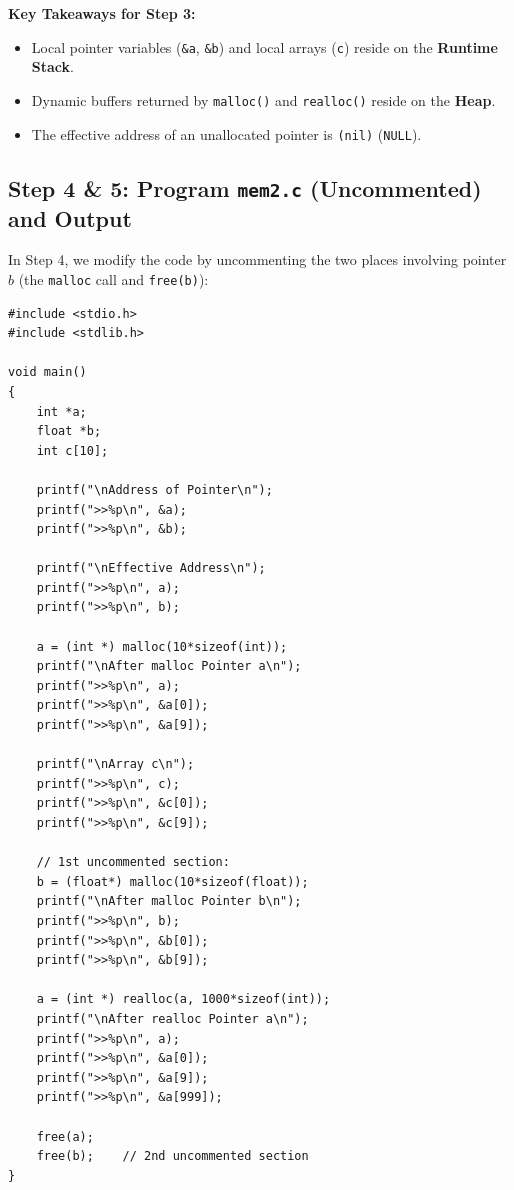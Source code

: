 \documentclass[12pt,a4paper]{article}
\begin{document}
\textbf{Key Takeaways for Step 3:}
\begin{itemize}
    \item Local pointer variables (\texttt{\&a}, \texttt{\&b}) and local arrays (\texttt{c}) reside on the \textbf{Runtime Stack}.
    \item Dynamic buffers returned by \texttt{malloc()} and \texttt{realloc()} reside on the \textbf{Heap}.
    \item The effective address of an unallocated pointer is \texttt{(nil)} (\texttt{NULL}).
\end{itemize}

\clearpage
\subsection{Step 4 \& 5: Program \texttt{mem2.c} (Uncommented) and Output}

In Step 4, we modify the code by uncommenting the two places involving pointer $b$ (the \texttt{malloc} call and \texttt{free(b)}):

\begin{lstlisting}[style=cstyle]
#include <stdio.h>
#include <stdlib.h>

void main()
{
    int *a;
    float *b;
    int c[10];

    printf("\nAddress of Pointer\n");
    printf(">>%p\n", &a);
    printf(">>%p\n", &b);

    printf("\nEffective Address\n");
    printf(">>%p\n", a);
    printf(">>%p\n", b);

    a = (int *) malloc(10*sizeof(int));
    printf("\nAfter malloc Pointer a\n");
    printf(">>%p\n", a);
    printf(">>%p\n", &a[0]);
    printf(">>%p\n", &a[9]);

    printf("\nArray c\n");
    printf(">>%p\n", c);
    printf(">>%p\n", &c[0]);
    printf(">>%p\n", &c[9]);

    // 1st uncommented section:
    b = (float*) malloc(10*sizeof(float));
    printf("\nAfter malloc Pointer b\n");
    printf(">>%p\n", b);
    printf(">>%p\n", &b[0]);
    printf(">>%p\n", &b[9]);

    a = (int *) realloc(a, 1000*sizeof(int));
    printf("\nAfter realloc Pointer a\n");
    printf(">>%p\n", a);
    printf(">>%p\n", &a[0]);
    printf(">>%p\n", &a[9]);
    printf(">>%p\n", &a[999]);

    free(a);
    free(b);    // 2nd uncommented section
}
\end{lstlisting}
\end{document}
